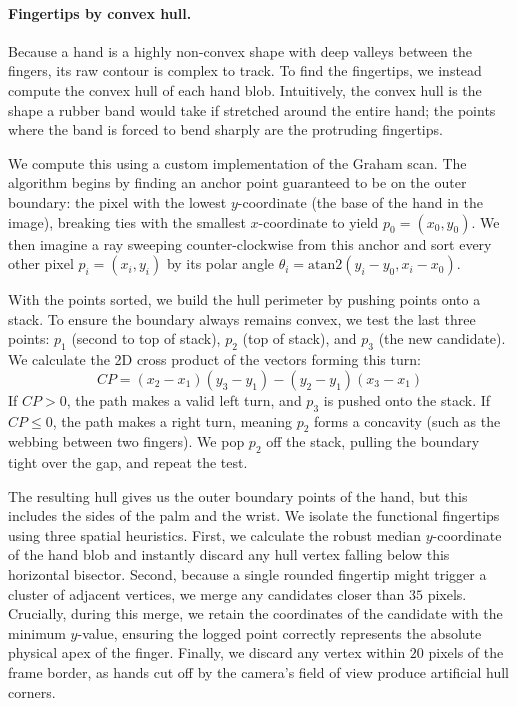 \documentclass[11pt]{article}
\begin{document}
\paragraph{Fingertips by convex hull.}
Because a hand is a highly non-convex shape with deep valleys between the fingers, 
its raw contour is complex to track. To find the fingertips, we instead compute the 
convex hull of each hand blob. Intuitively, the convex hull is the shape a rubber 
band would take if stretched around the entire hand; the points where the band is 
forced to bend sharply are the protruding fingertips. 

We compute this using a custom implementation of the Graham scan.
The algorithm begins by finding an anchor point guaranteed to be on the outer boundary: 
the pixel with the lowest $y$-coordinate (the base of the hand in the image), breaking 
ties with the smallest $x$-coordinate to yield $p_0 = (x_0, y_0)$. We then imagine a ray 
sweeping counter-clockwise from this anchor and sort every other pixel $p_i = (x_i, y_i)$ 
by its polar angle $\theta_i = \text{atan2}(y_i - y_0, x_i - x_0)$.

With the points sorted, we build the hull perimeter by pushing points onto a stack. 
To ensure the boundary always remains convex, we test the last three points: $p_1$ 
(second to top of stack), $p_2$ (top of stack), and $p_3$ (the new candidate). 
We calculate the 2D cross product of the vectors forming this turn:
\begin{equation}
    CP = (x_2 - x_1)(y_3 - y_1) - (y_2 - y_1)(x_3 - x_1)
\end{equation}
If $CP > 0$, the path makes a valid left turn, and $p_3$ is pushed onto the stack. 
If $CP \le 0$, the path makes a right turn, meaning $p_2$ forms a concavity (such as 
the webbing between two fingers). We pop $p_2$ off the stack, pulling the boundary 
tight over the gap, and repeat the test.

The resulting hull gives us the outer boundary points of the hand, but this includes 
the sides of the palm and the wrist. We isolate the functional fingertips using three 
spatial heuristics. First, we calculate the robust median $y$-coordinate of the hand 
blob and instantly discard any hull vertex falling below this horizontal bisector. 
Second, because a single rounded fingertip might trigger a cluster of adjacent vertices, 
we merge any candidates closer than $35$ pixels. Crucially, during this merge, we 
retain the coordinates of the candidate with the minimum $y$-value, ensuring the logged 
point correctly represents the absolute physical apex of the finger. Finally, we discard 
any vertex within $20$ pixels of the frame border, as hands cut off by the camera's 
field of view produce artificial hull corners. 
\end{document}
